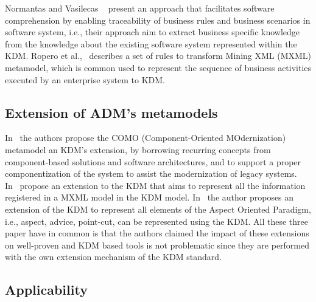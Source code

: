 Normantas and Vasilecas ~\cite{lastDAyOFMyLife} present an approach that facilitates software comprehension by enabling traceability of business rules and business scenarios in software system, i.e., their approach aim to extract business specific knowledge from the knowledge about the existing software system represented within the KDM. Ropero et al.,~\cite{Fernandez-Ropero:2012:EAB:2367051.2367064} describes a set of rules to transform Mining XML (MXML) metamodel, which is common used to represent the sequence of business activities executed by an enterprise system to KDM. %


\subsection{Extension of ADM's metamodels} %
\label{ssub:extension_of_adm_s_metamodels}


In~\cite{5773392} the authors propose the COMO (Component-Oriented MOdernization) metamodel an KDM's extension, by borrowing recurring concepts from component-based solutions and software architectures, and to support a proper componentization of the system to assist the modernization of legacy systems. In~\cite{Perez-Castillo:2012:IEL:2231936.2231949} propose an extension to the KDM that aims to represent all the information registered in a MXML model in the KDM model. In~\cite{library7329} the author proposes an extension of the KDM to represent all elements of the Aspect Oriented Paradigm, i.e., aspect, advice, point-cut, can be represented using the KDM. All these three paper have in common is that the authors claimed the impact of these extensions on well-proven and KDM based tools is not problematic since they are performed with the own extension mechanism of the KDM standard.


\subsection{Applicability} %
\label{ssub:applicability}



